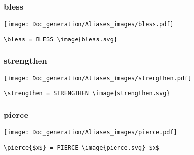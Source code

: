 \documentclass{article}
\begin{document}
\subsubsection{bless}
\begin{minipage}{0.45\linewidth}
\raggedright
\begin{spverbatim}
\bless
\end{spverbatim}
\end{minipage}
\begin{minipage}{0.45\linewidth}
\raggedleft
\texttt{[image: Doc\_generation/Aliases\_images/bless.pdf]}
\end{minipage}
\begin{center}
\begin{BVerbatim}
\bless = BLESS \image{bless.svg}
\end{BVerbatim}
\end{center}

\subsubsection{strengthen}
\begin{minipage}{0.45\linewidth}
\raggedright
\begin{spverbatim}
\strengthen
\end{spverbatim}
\end{minipage}
\begin{minipage}{0.45\linewidth}
\raggedleft
\texttt{[image: Doc\_generation/Aliases\_images/strengthen.pdf]}
\end{minipage}
\begin{center}
\begin{BVerbatim}
\strengthen = STRENGTHEN \image{strengthen.svg}
\end{BVerbatim}
\end{center}

\subsubsection{pierce}
\begin{minipage}{0.45\linewidth}
\raggedright
\begin{spverbatim}
\end{spverbatim}
\end{minipage}
\begin{minipage}{0.45\linewidth}
\raggedleft
\texttt{[image: Doc\_generation/Aliases\_images/pierce.pdf]}
\end{minipage}
\begin{center}
\begin{BVerbatim}
\pierce{$x$} = PIERCE \image{pierce.svg} $x$
\end{BVerbatim}
\end{center}
\end{document}
